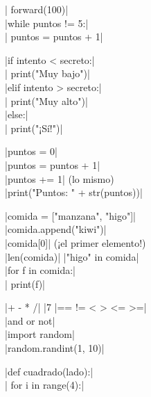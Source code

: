 \begin{tcbraster}
\begin{tcolorbox}[colback=white, colframe=control, colbacktitle=control!40, title=\textbf{Bucles}]
\py|    forward(100)|\\[3pt]
\py|while puntos != 5:|\\
\py|    puntos = puntos + 1|
\end{tcolorbox}
\begin{tcolorbox}[colback=white, colframe=control, colbacktitle=control!40, title=\textbf{Si (if)}]
\py|if intento < secreto:|\\
\py|    print("Muy bajo")|\\
\py|elif intento > secreto:|\\
\py|    print("Muy alto")|\\
\py|else:|\\
\py|    print("¡Sí!")|
\end{tcolorbox}
\begin{tcolorbox}[colback=white, colframe=variables, colbacktitle=variables!40, title=\textbf{Variables}]
\py|puntos = 0|\\
\py|puntos = puntos + 1|\\
\py|puntos += 1| {\color{muted}(lo mismo)}\\
\py|print("Puntos: " + str(puntos))|
\end{tcolorbox}
\begin{tcolorbox}[colback=white, colframe=lists, colbacktitle=lists!40, title=\textbf{Listas}]
\py|comida = ["manzana", "higo"]|\\
\py|comida.append("kiwi")|\\
\py|comida[0]| {\color{muted}(¡el primer elemento!)}\\
\py|len(comida)| \quad \py|"higo" in comida|\\
\py|for f in comida:|\\
\py|    print(f)|
\end{tcolorbox}
\begin{tcolorbox}[colback=white, colframe=operators, colbacktitle=operators!40, title=\textbf{Operadores}]
\py|+  -  *  /| \quad \py|7 %
\py|==  !=  <  >  <=  >=|\\
\py|and  or  not|\\
\py|import random|\\
\py|random.randint(1, 10)|
\end{tcolorbox}
\begin{tcolorbox}[colback=white, colframe=myblocks, colbacktitle=myblocks!40, title=\textbf{Mi propio bloque}]
\py|def cuadrado(lado):|\\
\py|    for i in range(4):|\\

\end{tcolorbox}
\end{tcbraster}
